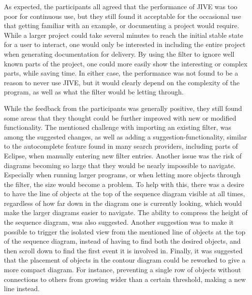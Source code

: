 As expected, the participants all agreed that the performance of JIVE was too poor for continuous use, but they still found it acceptable for the occasional use that getting familiar with an example, or documenting a project would require.
While a larger project could take several minutes to reach the initial stable state for a user to interact, one would only be interested in including the entire project when generating documentation for delivery.
By using the filter to ignore well known parts of the project, one could more easily show the interesting or complex parts, while saving time.
In either case, the performance was not found to be a reason to never use JIVE, but it would clearly depend on the complexity of the program, as well as what the filter would be letting through.

While the feedback from the participants was generally positive, they still found some areas that they thought could be further improved with new or modified functionality.
The mentioned challenge with importing an existing filter, was among the suggested changes, as well as adding a suggestion-functionality, similar to the autocomplete feature found in many search providers, including parts of Eclipse, when manually entering new filter entries.
Another issue was the risk of diagrams becoming so large that they would be nearly impossible to navigate.
Especially when running larger programs, or when letting more objects through the filter, the size would become a problem.
To help with this, there was a desire to have the line of objects at the top of the sequence diagram visible at all times, regardless of how far down in the diagram one is currently looking, which would make the larger diagrams easier to navigate.
The ability to compress the height of the sequence diagram, was also suggested.
Another suggestion was to make it possible to trigger the isolated view from the mentioned line of objects at the top of the sequence diagram, instead of having to find both the desired objects, and then scroll down to find the first event it is involved in.
Finally, it was suggested that the placement of objects in the contour diagram could be reworked to give a more compact diagram.
For instance, preventing a single row of objects without connections to others from growing wider than a certain threshold, making a new line instead.
